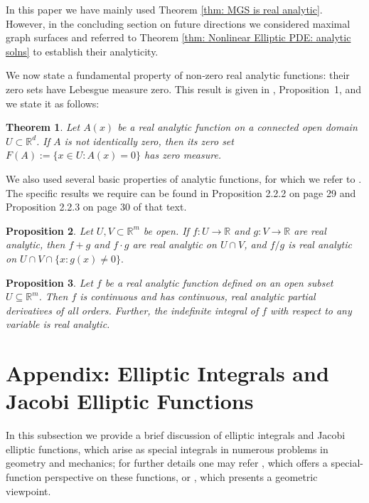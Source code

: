 \documentclass[12pt]{article}
\theoremstyle{plain}
\newtheorem{theorem}{Theorem}[section]
\newtheorem{proposition}[theorem]{Proposition}
\theoremstyle{definition}
\theoremstyle{remark}
\begin{document}
   
   In this paper we have mainly used Theorem \ref{thm: MGS is real analytic}. However, in the concluding section on future directions we considered maximal graph surfaces and referred to Theorem \ref{thm: Nonlinear Elliptic PDE: analytic solns} to establish their analyticity.
   
   We now state a fundamental property  of non‑zero real analytic functions: their zero sets have Lebesgue measure zero. This result is given in \cite{Mi}, Proposition~1, and we state it as follows:
   \begin{theorem}
   	\label{thm: zero set of real analytic fns}
   	Let \( A(x) \) be a real analytic function on a connected open domain \( U \subset \mathbb{R}^d \). If \( A \) is not identically zero, then its zero set \(F(A) := \{ x \in U : A(x) = 0 \}\)	has zero measure.     	
   \end{theorem}
   
   We also used several basic properties of analytic functions, for which we refer to \cite{KH}. The specific results we require can be found in Proposition 2.2.2 on page 29 and Proposition 2.2.3 on page 30 of that text.
   
   \begin{proposition}
   	\label{thm: algebra of real analytic functions}
   	Let \( U, V \subset \mathbb{R}^m \) be open. If \( f : U \to \mathbb{R} \) and \( g : V \to \mathbb{R} \) are real analytic, then \( f + g \) and \( f \cdot g \) are real analytic on \( U \cap V \), and \( f / g \) is real analytic on \( U \cap V \cap \{ x : g(x) \neq 0 \}. \)
   \end{proposition}
   
   \begin{proposition}
   	\label{thm: calculus of real analytic functions}
   	Let \( f \) be a real analytic function defined on an open subset \( U \subseteq \mathbb{R}^m \).
   	Then \( f \) is continuous and has continuous, real analytic partial derivatives of all orders.
   	Further, the indefinite integral of \( f \) with respect to any variable is real analytic.
   \end{proposition}    
   
   \section{Appendix: Elliptic Integrals and Jacobi Elliptic Functions}\label{section: Elliptic funnctions}
   In this subsection we provide a brief discussion of elliptic integrals and Jacobi elliptic functions, which arise as special integrals in numerous problems in geometry and mechanics; for further details one may refer \cite{La}, which offers a special-function perspective on these functions, or \cite{TT}, which presents a geometric viewpoint. 
   
\end{document}
